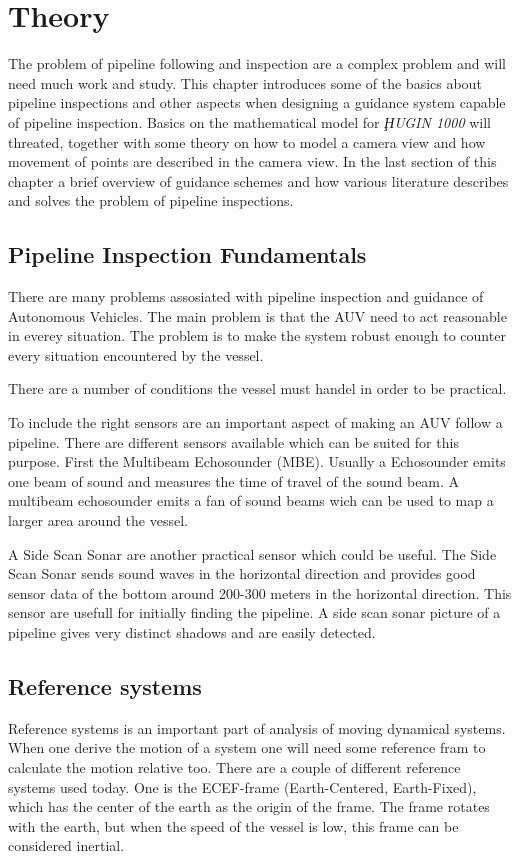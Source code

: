 \chapter{Theory}
	The problem of pipeline following and inspection are a complex problem and will need much work and
	study. This chapter introduces some of the basics about pipeline inspections and other aspects when
	designing a guidance system capable of pipeline inspection. Basics on the mathematical model for
	\textit{ḨUGIN 1000} will threated, together with some theory on how to model a camera view and how
	movement of points are described in the camera view. In the last section of this chapter a brief
	overview of guidance schemes and how various literature describes and solves the problem of pipeline
	inspections.

\section{Pipeline Inspection Fundamentals}
	There are many problems assosiated with pipeline inspection and guidance of Autonomous Vehicles. The
	main problem is that the AUV need to act reasonable in everey situation. The problem is to make the
	system robust enough to counter every situation encountered by the vessel. 

	There are a number of conditions the vessel must handel in order to be practical.
	
	To include the right sensors are an important aspect of making an AUV follow a pipeline. There are
	different sensors available which can be suited for this purpose. First the Multibeam Echosounder
	(MBE). Usually a Echosounder emits one beam of sound and measures the time of travel of the sound
	beam. A multibeam echosounder emits a fan of sound beams wich can be used to map a larger area around
	the vessel.

	A Side Scan Sonar are another practical sensor which could be useful. The Side Scan Sonar sends sound
	waves in the horizontal direction and provides good sensor data of the bottom around 200-300 meters in
	the horizontal direction. This sensor are usefull for initially finding the pipeline. A side scan
	sonar picture of a pipeline gives very distinct shadows and are easily detected. 
	
\section{Reference systems}
	Reference systems is an important part of analysis of moving dynamical systems. When one derive the motion of 
	a system one will need some reference fram to calculate the motion relative too. There are a couple of different 
	reference systems used today. One is the ECEF-frame (Earth-Centered, Earth-Fixed), which has the center of the 
	earth as the origin of the frame. The frame rotates with the earth, but when the speed of the vessel is low, 
	this frame can be considered inertial. \cite{gps_bok}
	
